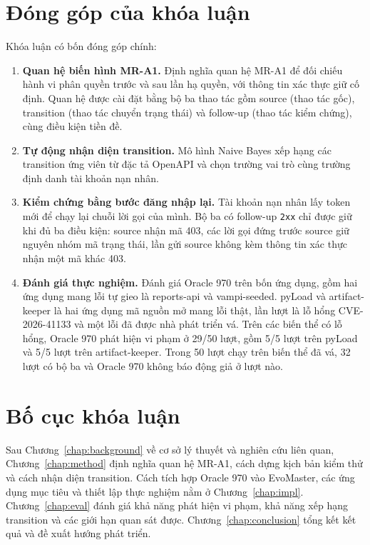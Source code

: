 \section{Đóng góp của khóa luận}
\label{sec:intro_contributions}

Khóa luận có bốn đóng góp chính:

\begin{enumerate}
    \item \textbf{Quan hệ biến hình MR-A1.} Định nghĩa quan hệ MR-A1 để đối chiếu hành vi phân quyền trước và sau lần hạ quyền, với thông tin xác thực giữ cố định. Quan hệ được cài đặt bằng bộ ba thao tác gồm source (thao tác gốc), transition (thao tác chuyển trạng thái) và follow-up (thao tác kiểm chứng), cùng điều kiện tiền đề.
    \item \textbf{Tự động nhận diện transition.} Mô hình Naive Bayes xếp hạng các transition ứng viên từ đặc tả OpenAPI và chọn trường vai trò cùng trường định danh tài khoản nạn nhân.
    \item \textbf{Kiểm chứng bằng bước đăng nhập lại.} Tài khoản nạn nhân lấy token mới để chạy lại chuỗi lời gọi của mình. Bộ ba có follow-up \texttt{2xx} chỉ được giữ khi đủ ba điều kiện: source nhận mã 403, các lời gọi đứng trước source giữ nguyên nhóm mã trạng thái, lần gửi source không kèm thông tin xác thực nhận một mã khác 403.
    \item \textbf{Đánh giá thực nghiệm.} Đánh giá Oracle 970 trên bốn ứng dụng, gồm hai ứng dụng mang lỗi tự gieo là reports-api và vampi-seeded. pyLoad và artifact-keeper là hai ứng dụng mã nguồn mở mang lỗi thật, lần lượt là lỗ hổng \mbox{CVE-2026-41133} và một lỗi đã được nhà phát triển vá. Trên các biến thể có lỗ hổng, Oracle 970 phát hiện vi phạm ở 29/50 lượt, gồm 5/5 lượt trên pyLoad và 5/5 lượt trên artifact-keeper. Trong 50 lượt chạy trên biến thể đã vá, 32 lượt có bộ ba và Oracle 970 không báo động giả ở lượt nào.
\end{enumerate}

\section{Bố cục khóa luận}
\label{sec:intro_organization}

Sau Chương~\ref{chap:background} về cơ sở lý thuyết và nghiên cứu liên quan, Chương~\ref{chap:method} định nghĩa quan hệ MR-A1, cách dựng kịch bản kiểm thử và cách nhận diện transition. Cách tích hợp Oracle 970 vào EvoMaster, các ứng dụng mục tiêu và thiết lập thực nghiệm nằm ở Chương~\ref{chap:impl}. Chương~\ref{chap:eval} đánh giá khả năng phát hiện vi phạm, khả năng xếp hạng transition và các giới hạn quan sát được. Chương~\ref{chap:conclusion} tổng kết kết quả và đề xuất hướng phát triển.
